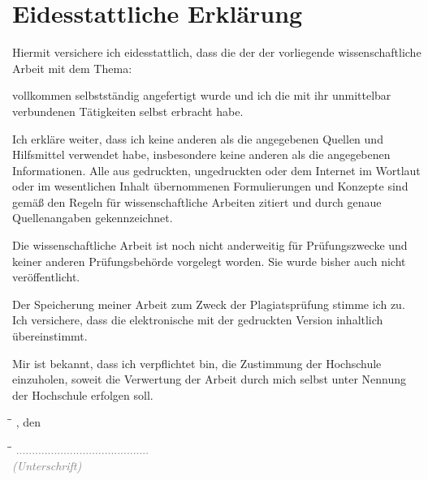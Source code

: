 
\chapter*{Eidesstattliche Erklärung}
{}
\thispagestyle{empty}

Hiermit versichere ich eidesstattlich, dass die der \myfaculty{} der \myuniversity{} vorliegende wissenschaftliche Arbeit mit dem Thema:

\begin{center}
  \textit{\mytitle}
\end{center}

vollkommen selbstständig angefertigt wurde und ich die mit ihr unmittelbar verbundenen Tätigkeiten selbst erbracht habe.

Ich erkläre weiter, dass ich keine anderen als die angegebenen Quellen und Hilfsmittel verwendet habe, insbesondere keine anderen als die angegebenen Informationen. Alle aus gedruckten, ungedruckten oder dem Internet im Wortlaut oder im wesentlichen Inhalt übernommenen Formulierungen und Konzepte sind gemäß den Regeln für wissenschaftliche Arbeiten zitiert und durch genaue Quellenangaben gekennzeichnet.

Die wissenschaftliche Arbeit ist noch nicht anderweitig für Prüfungszwecke und keiner anderen Prüfungsbehörde vorgelegt worden. Sie wurde bisher auch nicht veröffentlicht.

Der Speicherung meiner Arbeit zum Zweck der Plagiatsprüfung stimme ich zu. Ich versichere, dass die elektronische mit der gedruckten Version inhaltlich übereinstimmt.

Mir ist bekannt, dass ich verpflichtet bin, die Zustimmung der Hochschule einzuholen, soweit die Verwertung der Arbeit durch mich selbst unter Nennung der Hochschule erfolgen soll.


\begin{tabbing}
  \hspace*{10cm} \= \hspace*{5cm}\= \kill
  \myplace, den \timeend \>
\end{tabbing}

\vspace{-1.5cm}

\begin{tabbing}
  \hspace*{10cm} \= \hspace*{5cm}\= \kill
  \> \textcolor{gray}{..........................................}\\	
  \> \textcolor{gray}{\textit{(Unterschrift)}}
\end{tabbing}